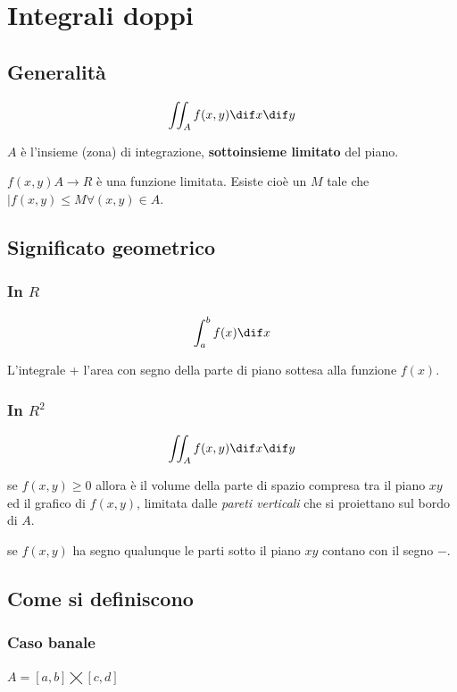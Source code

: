 \section{Integrali doppi}

\subsection{Generalità}

$$\iint_A f(x,y) \dif x \dif y$$

$A$ è l'insieme (zona) di integrazione, \textbf{sottoinsieme limitato} del piano.

$f(x,y) A\to R$ è una funzione limitata. Esiste cioè un $M$ tale che $|f(x,y) \leq M \forall (x,y) \in A$.

\subsection{Significato geometrico}

\subsubsection{In $R$}

$$\int_a^b f(x) \dif x$$

L'integrale + l'area con segno della parte di piano sottesa alla funzione $f(x)$.

\subsubsection{In $R^2$}

$$\iint_A f(x,y) \dif x \dif y$$

se $f(x,y) \ge 0$ allora è il volume della parte di spazio compresa tra il piano $xy$ ed il grafico di $f(x,y)$, limitata dalle \textit{pareti verticali} che si proiettano sul bordo di $A$.

se $f(x,y)$ ha segno qualunque le parti sotto il piano $xy$ contano con il segno $-$.

\subsection{Come si definiscono}

\subsubsection{Caso banale}

$A= [a,b] \bigtimes [c,d]$

